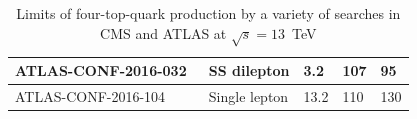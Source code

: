 \begin{table}[h!]
\begin{tabular}{l|l|l|l|l}
ATLAS-CONF-2016-032~\cite{ATLAS-CONF-2016-032}            & SS dilepton                  & 3.2                                         & 107                                      & 95                                       \T \B \\ \hline
ATLAS-CONF-2016-104~\cite{ATLAS-CONF-2016-104}            & Single lepton                & 13.2                                        & 110                                      & 130                                      \T \B \\ 
\end{tabular}
\caption{Limits of four-top-quark production by a variety of searches in CMS and ATLAS at $\sqrt{s}=13$~TeV}
\label{tab:CmsAtlasSum}
\end{table}



